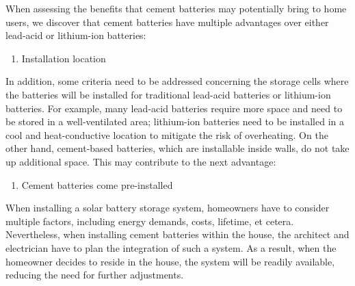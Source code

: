 When assessing the benefits that cement batteries may potentially bring to home users, we discover that cement batteries have multiple advantages over either lead-acid or lithium-ion batteries:
\begin{enumerate}
    \item Installation location
\end{enumerate}
In addition, some criteria need to be addressed concerning the storage cells where the batteries will be installed for traditional lead-acid batteries or lithium-ion batteries. For example, many lead-acid batteries require more space and need to be stored in a well-ventilated area; lithium-ion batteries need to be installed in a cool and heat-conductive location to mitigate the risk of overheating. On the other hand, cement-based batteries, which are installable inside walls, do not take up additional space. This may contribute to the next advantage:

\begin{enumerate}[resume]
    \item Cement batteries come pre-installed
\end{enumerate}
When installing a solar battery storage system, homeowners have to consider multiple factors, including energy demands, costs, lifetime, et cetera. Nevertheless, when installing cement batteries within the house, the architect and electrician have to plan the integration of such a system. As a result, when the homeowner decides to reside in the house, the system will be readily available, reducing the need for further adjustments.
